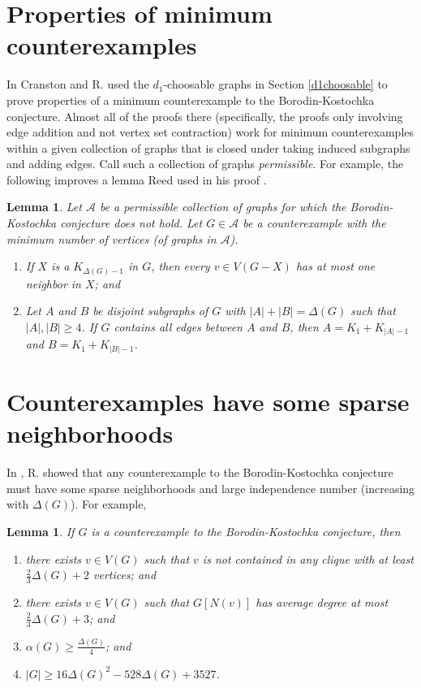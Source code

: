 \documentclass[12pt]{article}
\theoremstyle{plain}
\newtheorem{lem}[thm]{Lemma}
\theoremstyle{definition}
\theoremstyle{remark}
\newcommand{\fancy}[1]{\mathcal{#1}}
\newcommand{\card}[1]{\left|#1\right|}
\def\A{\fancy{A}}
\begin{document}
\section{Properties of minimum counterexamples}\label{mules}
In \cite{cranstonrabernapriori} Cranston and R. used the $d_1$-choosable graphs in Section \ref{d1choosable} to prove properties 
of a minimum counterexample to the Borodin-Kostochka conjecture.  Almost all of the proofs there (specifically, the proofs only involving edge addition and not vertex set contraction)
work for minimum counterexamples within a given collection of graphs that is closed under taking induced subgraphs and adding edges.  Call such a collection of graphs \emph{permissible}.
For example, the following improves a lemma Reed used in his proof \cite{reed1999strengthening}.

\begin{lem}
Let $\A$ be a permissible collection of graphs for which the Borodin-Kostochka conjecture does not hold.  Let $G \in \A$ be a counterexample with the minimum number of 
vertices (of graphs in $\A$). 
\begin{enumerate}
\item If $X$ is a $K_{\Delta(G) - 1}$ in $G$, then every $v \in V(G-X)$ has at most one neighbor in $X$; and
\item Let $A$ and $B$ be disjoint subgraphs of $G$ with $\card{A} + \card{B} = \Delta(G)$ such that $\card{A},\card{B} \ge 4$.  If $G$ contains all edges between $A$ and $B$,
then $A = K_1 + K_{\card{A} - 1}$ and $B = K_1 + K_{\card{B} - 1}$.
\end{enumerate}

\end{lem}

\section{Counterexamples have some sparse neighborhoods}\label{sparseneighborhoods}
In \cite{denseneighborhoods}, R. showed that any counterexample to the Borodin-Kostochka conjecture must have some sparse neighborhoods and large 
independence number (increasing with $\Delta(G)$).  For example,
\begin{lem}
If $G$ is a counterexample to the Borodin-Kostochka conjecture, then
\begin{enumerate}
\item there exists $v \in V(G)$ such that $v$ is not contained in any clique with at least $\frac23\Delta(G) + 2$ vertices; and
\item there exists $v \in V(G)$ such that $G[N(v)]$ has average degree at most $\frac23\Delta(G) + 3$; and
\item $\alpha(G) \ge \frac{\Delta(G)}{4}$; and 
\item $\card{G} \ge 16\Delta(G)^2 - 528\Delta(G) + 3527$.
\end{enumerate}
\end{lem}
\end{document}
